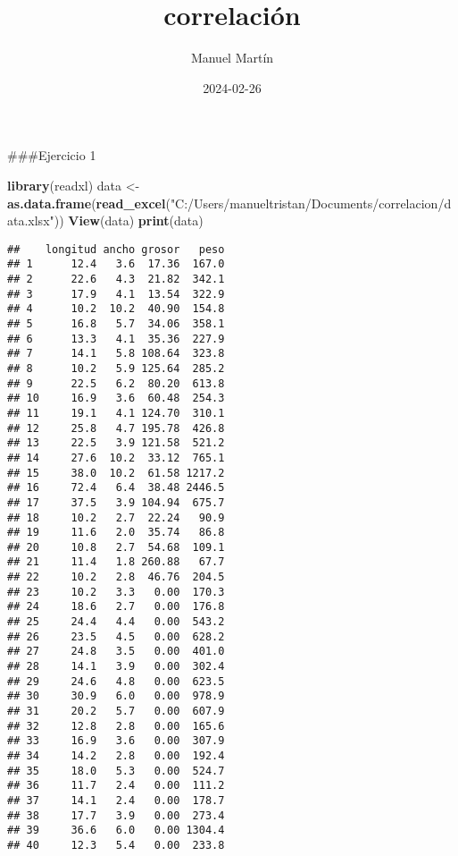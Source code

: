 \documentclass[
]{article}
\title{correlación}
\author{Manuel Martín}
\date{2024-02-26}
\newenvironment{Shaded}{\begin{snugshade}}{\end{snugshade}}
\newcommand{\FunctionTok}[1]{\textcolor[rgb]{0.13,0.29,0.53}{\textbf{#1}}}
\newcommand{\NormalTok}[1]{#1}
\newcommand{\OtherTok}[1]{\textcolor[rgb]{0.56,0.35,0.01}{#1}}
\newcommand{\StringTok}[1]{\textcolor[rgb]{0.31,0.60,0.02}{#1}}
\begin{document}
\maketitle

\#\#\#Ejercicio 1

\begin{Shaded}
\begin{Highlighting}[]
\FunctionTok{library}\NormalTok{(readxl)}
\NormalTok{data }\OtherTok{\textless{}{-}} \FunctionTok{as.data.frame}\NormalTok{(}\FunctionTok{read\_excel}\NormalTok{(}\StringTok{"C:/Users/manueltristan/Documents/correlacion/data.xlsx"}\NormalTok{))}
\FunctionTok{View}\NormalTok{(data)}
\FunctionTok{print}\NormalTok{(data)}
\end{Highlighting}
\end{Shaded}

\begin{verbatim}
##    longitud ancho grosor   peso
## 1      12.4   3.6  17.36  167.0
## 2      22.6   4.3  21.82  342.1
## 3      17.9   4.1  13.54  322.9
## 4      10.2  10.2  40.90  154.8
## 5      16.8   5.7  34.06  358.1
## 6      13.3   4.1  35.36  227.9
## 7      14.1   5.8 108.64  323.8
## 8      10.2   5.9 125.64  285.2
## 9      22.5   6.2  80.20  613.8
## 10     16.9   3.6  60.48  254.3
## 11     19.1   4.1 124.70  310.1
## 12     25.8   4.7 195.78  426.8
## 13     22.5   3.9 121.58  521.2
## 14     27.6  10.2  33.12  765.1
## 15     38.0  10.2  61.58 1217.2
## 16     72.4   6.4  38.48 2446.5
## 17     37.5   3.9 104.94  675.7
## 18     10.2   2.7  22.24   90.9
## 19     11.6   2.0  35.74   86.8
## 20     10.8   2.7  54.68  109.1
## 21     11.4   1.8 260.88   67.7
## 22     10.2   2.8  46.76  204.5
## 23     10.2   3.3   0.00  170.3
## 24     18.6   2.7   0.00  176.8
## 25     24.4   4.4   0.00  543.2
## 26     23.5   4.5   0.00  628.2
## 27     24.8   3.5   0.00  401.0
## 28     14.1   3.9   0.00  302.4
## 29     24.6   4.8   0.00  623.5
## 30     30.9   6.0   0.00  978.9
## 31     20.2   5.7   0.00  607.9
## 32     12.8   2.8   0.00  165.6
## 33     16.9   3.6   0.00  307.9
## 34     14.2   2.8   0.00  192.4
## 35     18.0   5.3   0.00  524.7
## 36     11.7   2.4   0.00  111.2
## 37     14.1   2.4   0.00  178.7
## 38     17.7   3.9   0.00  273.4
## 39     36.6   6.0   0.00 1304.4
## 40     12.3   5.4   0.00  233.8
\end{verbatim}
\end{document}
